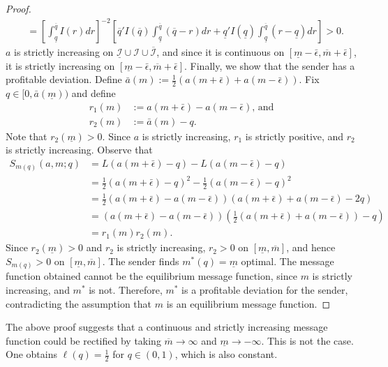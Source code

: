 \documentclass[12pt]{article}
\begin{document}
\begin{proof}
\begin{align}
&=\left[\int_{\underline{q}}^{\overline{q}}{I(r)dr}\right]^{-2}\left[\overline{q}'I(\overline{q})\int_{\underline{q}}^{\overline{q}}{(\overline{q}-r)dr}+\underline{q}'I(\underline{q})\int_{\underline{q}}^{\overline{q}}{(r-\underline{q})dr}\right]>0.
\end{align}
$a$ is strictly increasing on $\underline{\mathcal{I}}\cup\mathcal{I}\cup\overline{\mathcal{I}}$, and  since it is continuous on $[\underline{m}-\bar{\epsilon},\overline{m}+\bar{\epsilon}]$, it is strictly increasing on $[\underline{m}-\bar{\epsilon},\overline{m}+\bar{\epsilon}]$. Finally, we show that the sender has a profitable deviation. Define $\bar{a}(m):=\tfrac{1}{2}(a(m+\bar{\epsilon})+a(m-\bar{\epsilon}))$. Fix $q\in[0,\bar{a}(\underline{m}))$ and define
\begin{align}
r_{1}(m)&:=a(m+\bar{\epsilon})-a(m-\bar{\epsilon})\text{, and}\\
r_{2}(m)&:=\bar{a}(m)-q.
\end{align}
Note that $r_{2}(\underline{m})>0$. Since $a$ is strictly increasing, $r_{1}$ is strictly positive, and $r_{2}$ is strictly increasing. Observe that
\begin{align}
S_{m(q)}(a,m;q)&=L(a(m+\bar{\epsilon})-q)-L(a(m-\bar{\epsilon})-q)\\
&=\tfrac{1}{2}(a(m+\bar{\epsilon})-q)^{2}-\tfrac{1}{2}(a(m-\bar{\epsilon})-q)^{2}\\
&=\tfrac{1}{2}(a(m+\bar{\epsilon})-a(m-\bar{\epsilon}))(a(m+\bar{\epsilon})+a(m-\bar{\epsilon})-2q)\\
&=(a(m+\bar{\epsilon})-a(m-\bar{\epsilon}))(\tfrac{1}{2}(a(m+\bar{\epsilon})+a(m-\bar{\epsilon}))-q)\\
&=r_{1}(m)r_{2}(m).
\end{align}
Since $r_{2}(\underline{m})>0$ and $r_{2}$ is strictly increasing, $r_{2}>0$ on $[\underline{m},\overline{m}]$, and hence $S_{m(q)}>0$ on $[\underline{m},\overline{m}]$. The sender finds $m^{*}(q)=\underline{m}$ optimal. The message function obtained cannot be the equilibrium message function, since $m$ is strictly increasing, and $m^{*}$ is not. Therefore, $m^{*}$ is a profitable deviation for the sender, contradicting the assumption that $m$ is an equilibrium message function. 
\end{proof}
The above proof suggests that a continuous and strictly increasing message function could be rectified by taking $\overline{m}\rightarrow\infty$ and $\underline{m}\rightarrow-\infty$. This is not the case. One obtains $\ell(q)=\tfrac{1}{2}$ for $q\in(0,1)$, which is also constant. 
\end{document}
